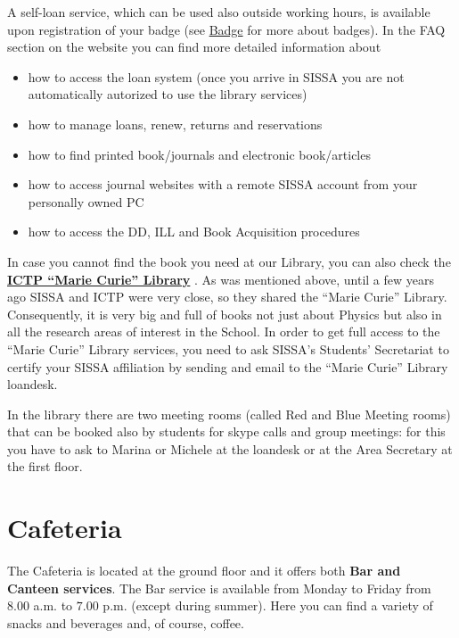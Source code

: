 \documentclass{sissavademecum}
\begin{document}
A self-loan service, which can be used also outside working hours, is available upon registration of your badge (see \hyperlink{Badge}{Badge} for more about badges). In the FAQ section on the website you can find more detailed information about
\begin{itemize}
    \item how to access the loan system (once you arrive in SISSA you are not automatically autorized to use the library services)
    \item how to manage loans, renew, returns and reservations
    \item how to find printed book/journals and electronic book/articles
    \item how to access journal websites with a remote SISSA account from your personally owned PC
    \item how to access the DD, ILL and Book Acquisition procedures
\end{itemize}

In case you cannot find the book you need at our Library, you can also check the \href{http://library.ictp.it/}{\textbf{ICTP ``Marie Curie'' Library}}
. As was mentioned above, until a few years ago SISSA and ICTP were very close, so they shared the ``Marie Curie'' Library. Consequently, it is very big and full of books not just about Physics but also in all the research areas of interest in the School. In order to get full access to the ``Marie Curie'' Library services, you need to ask SISSA's Students' Secretariat to certify your SISSA affiliation by sending and email to the ``Marie Curie'' Library loandesk.

In the library there are two meeting rooms (called Red and Blue Meeting rooms) that can be booked also by students for skype calls and group meetings: for this you have to ask to Marina or Michele at the loandesk or at the Area Secretary at the first floor. 


\section{Cafeteria}

The Cafeteria is located at the ground floor and it offers both \textbf{Bar and Canteen services}. The Bar service is available from Monday to Friday from $8.00$ a.m. to $7.00$ p.m. (except during summer). Here you can find a variety of snacks and beverages and, of course, coffee. 
\end{document}
